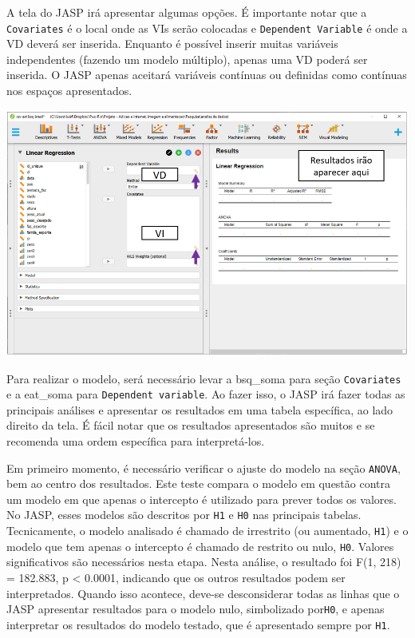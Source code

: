 \documentclass[
]{book}
\begin{document}
A tela do JASP irá apresentar algumas opções. É importante notar que a \texttt{Covariates} é o local onde as VIs serão colocadas e \texttt{Dependent\ Variable} é onde a VD deverá ser inserida. Enquanto é possível inserir muitas variáveis independentes (fazendo um modelo múltiplo), apenas uma VD poderá ser inserida. O JASP apenas aceitará variáveis contínuas ou definidas como contínuas nos espaços apresentados.

\includegraphics{./img/cap_reg_interface.png}

Para realizar o modelo, será necessário levar a bsq\_soma para seção \texttt{Covariates} e a eat\_soma para \texttt{Dependent\ variable}. Ao fazer isso, o JASP irá fazer todas as principais análises e apresentar os resultados em uma tabela específica, ao lado direito da tela. É fácil notar que os resultados apresentados são muitos e se recomenda uma ordem específica para interpretá-los.

Em primeiro momento, é necessário verificar o ajuste do modelo na seção \texttt{ANOVA}, bem ao centro dos resultados. Este teste compara o modelo em questão contra um modelo em que apenas o intercepto é utilizado para prever todos os valores. No JASP, esses modelos são descritos por \texttt{H1} e \texttt{H0} nas principais tabelas. Tecnicamente, o modelo analisado é chamado de irrestrito (ou aumentado, \texttt{H1}) e o modelo que tem apenas o intercepto é chamado de restrito ou nulo, \texttt{H0}. Valores significativos são necessários nesta etapa. Nesta análise, o resultado foi F(1, 218) = 182.883, p \textless{} 0.0001, indicando que os outros resultados podem ser interpretados. Quando isso acontece, deve-se desconsiderar todas as linhas que o JASP apresentar resultados para o modelo nulo, simbolizado por\texttt{H0}, e apenas interpretar os resultados do modelo testado, que é apresentado sempre por \texttt{H1}.
\end{document}
